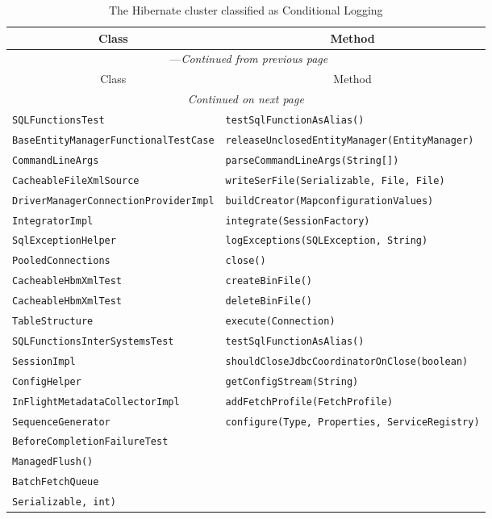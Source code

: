 \begin{center}
\begin{longtable}{ll}
\caption{The Hibernate cluster classified as Conditional Logging}\\
\toprule\multicolumn{1}{c}{Class}&\multicolumn{1}{c}{Method}\\\midrule
\endfirsthead

\multicolumn{2}{c}{\tablename\ \thetable{}---\textit{Continued from previous page}} \\\midrule
\multicolumn{1}{c}{Class}&\multicolumn{1}{c}{Method}\\\midrule
\endhead
\multicolumn{2}{c}{\textit{Continued on next page}}\\\midrule
\endfoot
\bottomrule
\endlastfoot
\lstinline/SQLFunctionsTest/&{\lstinline/testSqlFunctionAsAlias()/}\\
\lstinline/BaseEntityManagerFunctionalTestCase/&{\lstinline/releaseUnclosedEntityManager(EntityManager)/}\\
\lstinline/CommandLineArgs/&{\lstinline/parseCommandLineArgs(String[])/}\\
\lstinline/CacheableFileXmlSource/&{\lstinline/writeSerFile(Serializable, File, File)/}\\
\lstinline/DriverManagerConnectionProviderImpl/&{\lstinline/buildCreator(MapconfigurationValues)/}\\
\lstinline/IntegratorImpl/&{\lstinline/integrate(SessionFactory)/}\\
\lstinline/SqlExceptionHelper/&{\lstinline/logExceptions(SQLException, String)/}\\
\lstinline/PooledConnections/&{\lstinline/close()/}\\
\lstinline/CacheableHbmXmlTest/&{\lstinline/createBinFile()/}\\
\lstinline/CacheableHbmXmlTest/&{\lstinline/deleteBinFile()/}\\
\lstinline/TableStructure/&{\lstinline/execute(Connection)/}\\
\lstinline/SQLFunctionsInterSystemsTest/&{\lstinline/testSqlFunctionAsAlias()/}\\
\lstinline/SessionImpl/&{\lstinline/shouldCloseJdbcCoordinatorOnClose(boolean)/}\\
\lstinline/ConfigHelper/&{\lstinline/getConfigStream(String)/}\\
\lstinline/InFlightMetadataCollectorImpl/&{\lstinline/addFetchProfile(FetchProfile)/}\\
\lstinline/SequenceGenerator/&{\lstinline/configure(Type, Properties, ServiceRegistry)/}\\
\lstinline/BeforeCompletionFailureTest/&\raisebox{-13pt}{\shortstack{\lstinline/testUniqueConstraintViolationDuring/-\\\lstinline/ManagedFlush()/}}\\
\lstinline/BatchFetchQueue/&\raisebox{-13pt}{\shortstack{\lstinline/getCollectionBatch(CollectionPersister,/\\\lstinline/Serializable, int)/}}\\
\end{longtable}
\end{center}

